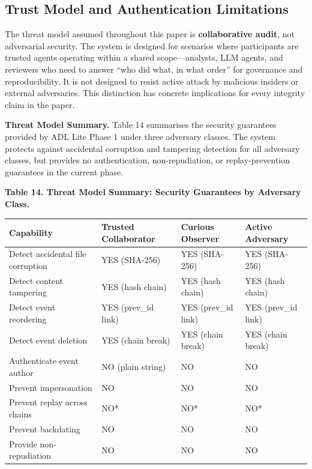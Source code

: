 \subsection{Trust Model and Authentication Limitations}\label{trust-model-and-authentication-limitations}

The threat model assumed throughout this paper is \textbf{collaborative audit}, not adversarial security. The system is designed for scenarios where participants are trusted agents operating within a shared scope---analysts, LLM agents, and reviewers who need to answer ``who did what, in what order'' for governance and reproducibility. It is not designed to resist active attack by malicious insiders or external adversaries. This distinction has concrete implications for every integrity claim in the paper.

\textbf{Threat Model Summary.} Table 14 summarises the security guarantees provided by ADL Lite Phase 1 under three adversary classes. The system protects against accidental corruption and tampering detection for all adversary classes, but provides no authentication, non-repudiation, or replay-prevention guarantees in the current phase.

\textbf{Table 14. Threat Model Summary: Security Guarantees by Adversary Class.}

\begin{longtable}[]{@{}>{\raggedright\arraybackslash}p{}
  >{\centering\arraybackslash}p{}
  >{\centering\arraybackslash}p{}
  >{\centering\arraybackslash}p{}@{}}
\toprule
Capability
& Trusted Collaborator
& Curious Observer
& Active Adversary
\\
\midrule
\endhead
\bottomrule
\endlastfoot
Detect accidental file corruption & YES (SHA-256) & YES (SHA-256) & YES (SHA-256) \\
Detect content tampering & YES (hash chain) & YES (hash chain) & YES (hash chain) \\
Detect event reordering & YES (prev\_id link) & YES (prev\_id link) & YES (prev\_id link) \\
Detect event deletion & YES (chain break) & YES (chain break) & YES (chain break) \\
Authenticate event author & NO (plain string) & NO & NO \\
Prevent impersonation & NO & NO & NO \\
Prevent replay across chains & NO* & NO* & NO* \\
Prevent backdating & NO & NO & NO \\
Provide non-repudiation & NO & NO & NO \\
\end{longtable}

